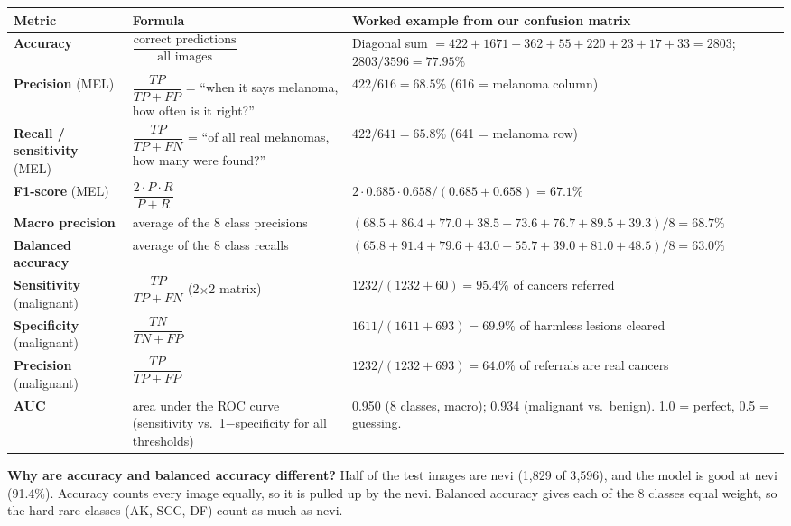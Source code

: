 \documentclass[10.5pt,a4paper]{article}
\begin{document}
\renewcommand{\arraystretch}{1.5}
\begin{tabularx}{\linewidth}{@{}L{2.6cm} L{4.3cm} Y@{}}
\toprule
\textbf{Metric} & \textbf{Formula} & \textbf{Worked example from our confusion matrix} \\
\midrule
\textbf{Accuracy} & $\dfrac{\text{correct predictions}}{\text{all images}}$ & Diagonal sum $=422+1671+362+55+220+23+17+33=2803$; $2803/3596=\mathbf{77.95\%}$ \\
\textbf{Precision} (MEL) & $\dfrac{TP}{TP+FP}$ = ``when it says melanoma, how often is it right?'' & $422/616=\mathbf{68.5\%}$ (616 = melanoma column) \\
\textbf{Recall / sensitivity} (MEL) & $\dfrac{TP}{TP+FN}$ = ``of all real melanomas, how many were found?'' & $422/641=\mathbf{65.8\%}$ (641 = melanoma row) \\
\textbf{F1-score} (MEL) & $\dfrac{2\cdot P\cdot R}{P+R}$ & $2\cdot0.685\cdot0.658/(0.685+0.658)=\mathbf{67.1\%}$ \\
\textbf{Macro precision} & average of the 8 class precisions & $(68.5+86.4+77.0+38.5+73.6+76.7+89.5+39.3)/8=\mathbf{68.7\%}$ \\
\textbf{Balanced accuracy} & average of the 8 class recalls & $(65.8+91.4+79.6+43.0+55.7+39.0+81.0+48.5)/8=\mathbf{63.0\%}$ \\
\textbf{Sensitivity} (malignant) & $\dfrac{TP}{TP+FN}$ (2$\times$2 matrix) & $1232/(1232+60)=\mathbf{95.4\%}$ of cancers referred \\
\textbf{Specificity} (malignant) & $\dfrac{TN}{TN+FP}$ & $1611/(1611+693)=\mathbf{69.9\%}$ of harmless lesions cleared \\
\textbf{Precision} (malignant) & $\dfrac{TP}{TP+FP}$ & $1232/(1232+693)=\mathbf{64.0\%}$ of referrals are real cancers \\
\textbf{AUC} & area under the ROC curve (sensitivity vs.\ 1$-$specificity for all thresholds) & 0.950 (8 classes, macro); 0.934 (malignant vs.\ benign). 1.0 = perfect, 0.5 = guessing. \\
\bottomrule
\end{tabularx}
\renewcommand{\arraystretch}{1.0}

\textbf{Why are accuracy and balanced accuracy different?} Half of the
test images are nevi (1{,}829 of 3{,}596), and the model is good at nevi
(91.4\%). Accuracy counts every image equally, so it is pulled up by the
nevi. Balanced accuracy gives each of the 8 classes equal weight, so the
hard rare classes (AK, SCC, DF) count as much as nevi.
\end{document}
